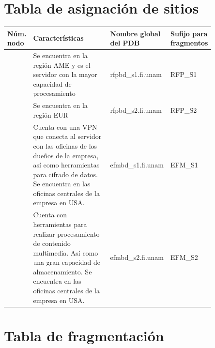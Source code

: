 \documentclass{article}
\begin{document}

\section*{Tabla de asignación de sitios}

\newcommand{\nameTabBuilder}[1]{F\_RFP\_#1}
\newcommand{\snI}{RFP\_S1}
\newcommand{\snII}{RFP\_S2}
\newcommand{\snIII}{EFM\_S1}
\newcommand{\snIV}{EFM\_S2}
\newcommand{\pdbI}{rfpbd\_s1.fi.unam}
\newcommand{\pdbII}{rfpbd\_s2.fi.unam}
\newcommand{\pdbIII}{efmbd\_s1.fi.unam}
\newcommand{\pdbIV}{efmbd\_s2.fi.unam}

{
  \setlength\tabcolsep{3.5mm}
  \def\arraystretch{2}          %
  \begin{longtable}{
    |C{0.05\linewidth}
    |p{0.5\linewidth}
    |C{0.2\linewidth}
    |p{0.1\linewidth}|}
  \hline
  \textbf{Núm. nodo} &
  \textbf{Características} & 
  \textbf{Nombre global del PDB} & 
  \parbox[t]{2cm}{\centering \textbf{Sufijo para fragmentos}} 
  \\ \hline
    &
  Se encuentra en la región AME y es el servidor con la mayor capacidad 
  de procesamiento & 
 \pdbI & 
  \snI 
  \\ \hline
    &
  Se encuentra en la región EUR & 
  \pdbII & 
  \snII
  \\ \hline
    &
  Cuenta con una VPN que conecta al servidor con las oficinas de los dueños de 
  la empresa, así como herramientas para cifrado de datos. Se encuentra en las 
  oficinas centrales de la empresa en USA. & 
  \pdbIII & 
  \snIII
  \\ \hline
    &
  Cuenta con herramientas para realizar procesamiento de contenido multimedia. 
  Así como una gran capacidad de almacenamiento. Se encuentra en las oficinas 
  centrales de la empresa en USA. & 
  \pdbIV & 
  \snIV
  \\ \hline
  \end{longtable}
}

\section*{Tabla de fragmentación}


\end{document}

